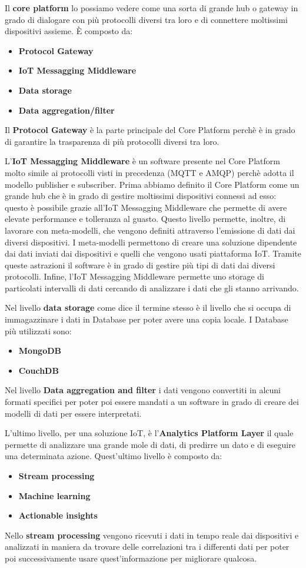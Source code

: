 \documentclass[10pt,a4paper,oneside]{scrbook}
\begin{document}
Il \textbf{core platform} lo possiamo vedere come una sorta di grande hub o gateway in grado di dialogare con più protocolli diversi tra loro e di connettere
moltissimi dispositivi assieme. È composto da:
\begin{itemize}
    \item \textbf{Protocol Gateway}
    \item \textbf{IoT Messagging Middleware}
    \item \textbf{Data storage}
    \item \textbf{Data aggregation/filter}
\end{itemize}
Il \textbf{Protocol Gateway} è la parte principale del Core Platform perchè è in grado di garantire la trasparenza di più protocolli diversi tra loro.

L'\textbf{IoT Messagging Middleware} è un software presente nel Core Platform molto simile ai protocolli visti in precedenza (MQTT e AMQP)
perchè adotta il modello publisher e subscriber. Prima abbiamo definito il Core Platform come un grande hub che è in grado di gestire moltissimi dispositivi
connessi ad esso: questo è possibile grazie all'IoT Messagging Middleware che permette di avere elevate performance e tolleranza al guasto.
Questo livello permette, inoltre, di lavorare con meta-modelli, che vengono definiti attraverso l'emissione di dati dai diversi dispositivi.
I meta-modelli permettono di creare una soluzione dipendente dai dati inviati dai dispositivi e quelli che vengono usati piattaforma IoT.
Tramite queste astrazioni il software è in grado di gestire più tipi di dati dai diversi protocolli. Infine, l'IoT Messagging Middleware permette
uno storage di particolati intervalli di dati cercando di analizzare i dati che gli stanno arrivando.

Nel livello \textbf{data storage} come dice il termine stesso è il livello che si occupa di immagazzinare i dati in Database per poter avere una copia locale.
I Database più utilizzati sono:
\begin{itemize}
    \item \textbf{MongoDB}
    \item \textbf{CouchDB}
\end{itemize}
Nel livello \textbf{Data aggregation and filter} i dati vengono convertiti in alcuni formati specifici per poter poi essere mandati a un software in grado
di creare dei modelli di dati per essere interpretati.

L'ultimo livello, per una soluzione IoT, è l'\textbf{Analytics Platform Layer} il quale permette di analizzare una grande mole di dati,
di predirre un dato e di eseguire una determinata azione. Quest'ultimo livello è composto da:
\begin{itemize}
    \item \textbf{Stream processing}
    \item \textbf{Machine learning}
    \item \textbf{Actionable insights}
\end{itemize}
Nello \textbf{stream processing} vengono ricevuti i dati in tempo reale dai dispositivi e analizzati in maniera da trovare delle correlazioni
tra i differenti dati per poter poi successivamente usare quest'informazione per migliorare qualcosa.
\end{document}
